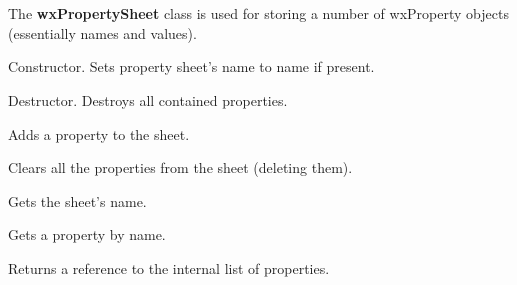 \section{}\label{wxpropertysheet}

The {\bf wxPropertySheet} class is used for storing a number of
wxProperty objects (essentially names and values).






Constructor. Sets property sheet's name to name if present.



Destructor. Destroys all contained properties.

\label{wxpropertysheetaddproperty}


Adds a property to the sheet.

\label{wxpropertysheetclear}


Clears all the properties from the sheet (deleting them).

\label{wxpropertysheetgetname}


Gets the sheet's name.

\label{wxpropertysheetgetproperty}


Gets a property by name.

\label{wxpropertysheetgetproperties}


Returns a reference to the internal list of properties.

